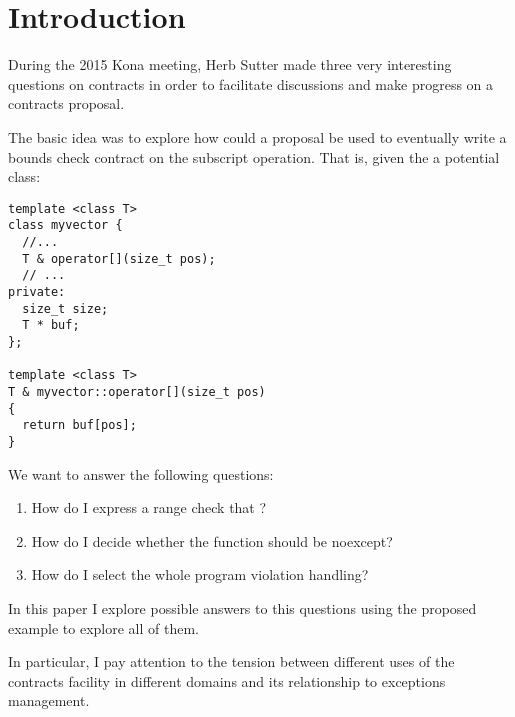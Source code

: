 \section{Introduction}

During the 2015 Kona meeting, Herb Sutter made three very interesting questions
on contracts in order to facilitate discussions and make progress on a contracts
proposal.

The basic idea was to explore how could a proposal be used to eventually write a
bounds check contract on the subscript operation. That is, given the a potential
 class:

\begin{lstlisting}
template <class T>
class myvector {
  //...
  T & operator[](size_t pos);
  // ...
private:
  size_t size;
  T * buf;
};

template <class T>
T & myvector::operator[](size_t pos)
{
  return buf[pos];
}
\end{lstlisting}

We want to answer the following questions:

\begin{enumerate}
  \item How do I express a range check that  ?
  \item How do I decide whether the function should be noexcept?
  \item How do I select the whole program violation handling?
\end{enumerate}

In this paper I explore possible answers to this questions using the proposed
example to explore all of them.

In particular, I pay attention to the tension between different uses of the
contracts facility in different domains and its relationship to exceptions management.


